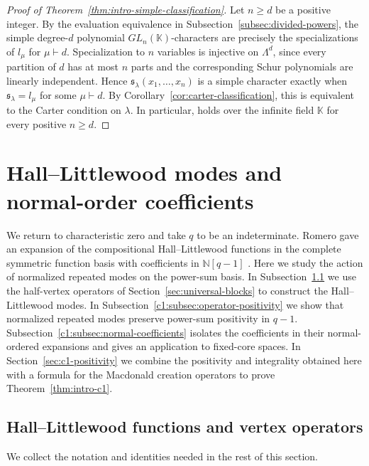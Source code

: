 \documentclass[12pt,reqno,a4paper]{amsart}
\numberwithin{equation}{section}
\numberwithin{figure}{section}
\theoremstyle{plain}
\theoremstyle{definition}
\begin{document}
\begin{proof}[Proof of Theorem~\ref{thm:intro-simple-classification}]
Let $n\geq d$ be a positive integer.  By the evaluation
equivalence in Subsection~\ref{subsec:divided-powers}, the simple
degree-$d$ polynomial $GL_n(\mathbb K)$-characters are precisely the
specializations of $l_\mu$ for $\mu\vdash d$.  Specialization to $n$
variables is injective on $\Lambda^d$, since every partition of $d$
has at most $n$ parts and the corresponding Schur polynomials are
linearly independent.  Hence $\mathfrak{s}_\lambda(x_1,\ldots,x_n)$
is a simple character exactly when $\mathfrak{s}_\lambda=l_\mu$
for some $\mu\vdash d$.  By Corollary~\ref{cor:carter-classification},
this is equivalent to the Carter condition on $\lambda$.  In particular,
\cite[Conjecture~4.6]{Walker} holds over the infinite field $\mathbb K$
for every positive $n\geq d$.
\end{proof}

\section{Hall--Littlewood modes and normal-order coefficients}
\label{sec:hl-mode-positivity}

We return to characteristic zero and take $q$ to be an indeterminate.
Romero gave an expansion of the compositional Hall--Littlewood
functions in the complete symmetric function basis with coefficients
in $\mathbb N[q-1]$ \cite[Proposition~5.1]{Romero}.
Here we study the action of normalized repeated modes on the power-sum basis.
In Subsection~\ref{c1:subsec:hall-littlewood} we use the half-vertex
operators of Section~\ref{sec:universal-blocks} to construct the
Hall--Littlewood modes.  In Subsection~\ref{c1:subsec:operator-positivity}
we show that normalized repeated modes preserve power-sum positivity
in $q-1$.  Subsection~\ref{c1:subsec:normal-coefficients} isolates the
coefficients in their normal-ordered expansions and gives an application
to fixed-core spaces.  In Section~\ref{sec:c1-positivity} we combine
the positivity and integrality obtained here with a formula for the
Macdonald creation operators to prove Theorem~\ref{thm:intro-c1}.

\subsection{Hall--Littlewood functions and vertex operators}
\label{c1:subsec:hall-littlewood}

We collect the notation and identities needed in the rest of this section.
\end{document}
